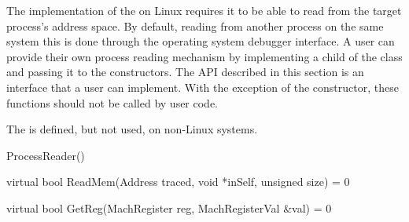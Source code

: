 The implementation of the  on Linux requires it to be able to read from the target process's address space. By default, reading from another process on the same system this is done through the operating system debugger interface. A user can provide their own process reading mechanism by implementing a child of the  class and passing it to the  constructors. 
The API described in this section is an interface that a user can implement. With the exception of the  constructor, these functions should not be called by user code.

The  is defined, but not used, on non-Linux systems.

\begin{apient}
ProcessReader()
\end{apient}

\begin{apient}
virtual bool ReadMem(Address traced,
                     void *inSelf,
                     unsigned size) = 0
\end{apient}

\begin{apient}
virtual bool GetReg(MachRegister reg,
                    MachRegisterVal &val) = 0
\end{apient}

